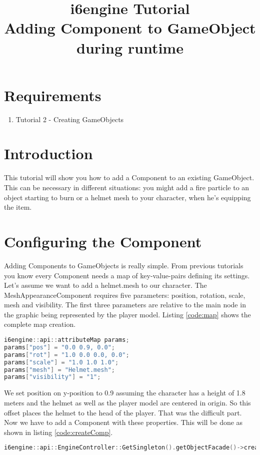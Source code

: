 \documentclass{article}
\title{i6engine Tutorial \\ Adding Component to GameObject during runtime}
\begin{document}
\section{Requirements}


\begin{enumerate}
\item Tutorial 2 - Creating GameObjects
\end{enumerate}

\section{Introduction}

This tutorial will show you how to add a Component to an existing GameObject. This can be necessary in different situations: you might add a fire particle to an object starting to burn or a helmet mesh to your character, when he's equipping the item.

\section{Configuring the Component}

Adding Components to GameObjects is really simple. From previous tutorials you know every Component needs a map of key-value-pairs defining its settings. Let's assume we want to add a helmet.mesh to our character. The MeshAppearanceComponent requires five parameters: position, rotation, scale, mesh and visibility. The first three parameters are relative to the main node in the graphic being represented by the player model. Listing \ref{code:map} shows the complete map creation.

\begin{lstlisting}[language=C++, style=basic, caption={configuring attributeMap}, label=code:map]
i6engine::api::attributeMap params;
params["pos"] = "0.0 0.9, 0.0";
params["rot"] = "1.0 0.0 0.0, 0.0";
params["scale"] = "1.0 1.0 1.0";
params["mesh"] = "Helmet.mesh";
params["visibility"] = "1";
\end{lstlisting}

We set position on y-position to 0.9 assuming the character has a height of 1.8 meters and the helmet as well as the player model are centered in origin. So this offset places the helmet to the head of the player. That was the difficult part. Now we have to add a Component with these properties. This will be done as shown in listing \ref{code:createComp}.

\begin{lstlisting}[language=C++, style=basic, caption={create Component}, label=code:createComp]
i6engine::api::EngineController::GetSingleton().getObjectFacade()->createComponent(goid, i6engine::api::EngineController::GetSingleton().getIDManager()->getID(), "MeshAppearance", params);
\end{lstlisting}
\end{document}
